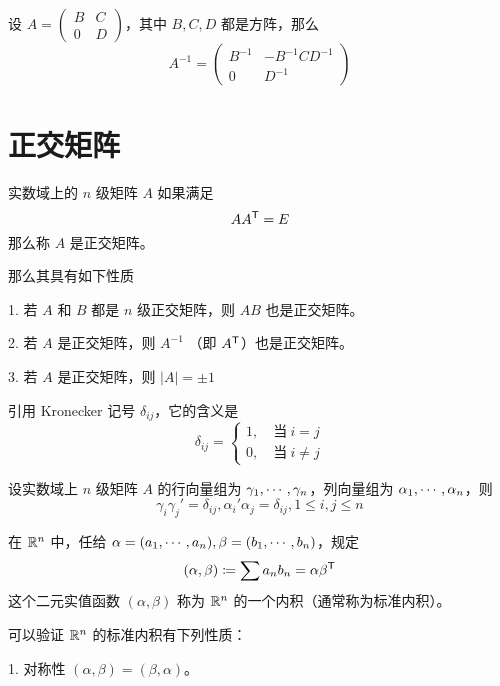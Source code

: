 \begin{theorem}
    设 $A = \left(\begin{matrix} B & C\\ 0 & D \end{matrix}\right)$，其中 $B,C,D$ 都是方阵，那么
    \[A^{-1} = \left(\begin{matrix} B^{-1} & -B^{-1}CD^{-1}\\ 0 & D^{-1} \end{matrix}\right)\]
\end{theorem}

\section{正交矩阵}

\begin{definition}
    实数域上的 $n$ 级矩阵 $A$ 如果满足
    \[A{A}^\mathsf{T}=E\]
    那么称 $A$ 是正交矩阵。
\end{definition}

那么其具有如下性质

1. 若 $A$ 和  $B$ 都是 $n$ 级正交矩阵，则 $AB$ 也是正交矩阵。

2. 若 $A$ 是正交矩阵，则 $A^{-1}$ （即 ${A}^\mathsf{T}$）也是正交矩阵。

3. 若 $A$ 是正交矩阵，则 $|A|=\pm 1$


引用 Kronecker 记号 $\delta_{ij}$，它的含义是
\[\delta_{ij}=\begin{cases}
    1,\quad \text{当}\ i = j\\
    0,\quad \text{当}\ i \ne j
\end{cases}\]

\begin{theorem}
    设实数域上 $n$ 级矩阵 $A$ 的行向量组为 $\gamma_1,\cdots,\gamma_n$，列向量组为 $\alpha_1,\cdots,\alpha_n$，则
    \[\gamma_i\gamma_j'=\delta_{ij},\alpha_i'\alpha_j=\delta_{ij},1 \leqslant i,j \leqslant n\]
\end{theorem}

\begin{definition}
    在 $\mathbb{R}^n$ 中，任给 $\alpha = (a_1,\cdots,a_n),\beta=(b_1,\cdots,b_n)$，规定
    \[(\alpha,\beta) \coloneqq  \sum a_nb_n = \alpha{\beta}^\mathsf{T}\]
    这个二元实值函数 $(\alpha,\beta)$ 称为 $\mathbb{R}^n$ 的一个内积（通常称为标准内积）。
\end{definition}

可以验证 $\mathbb{R}^n$ 的标准内积有下列性质：

1. 对称性 $(\alpha,\beta) = (\beta,\alpha)$。

